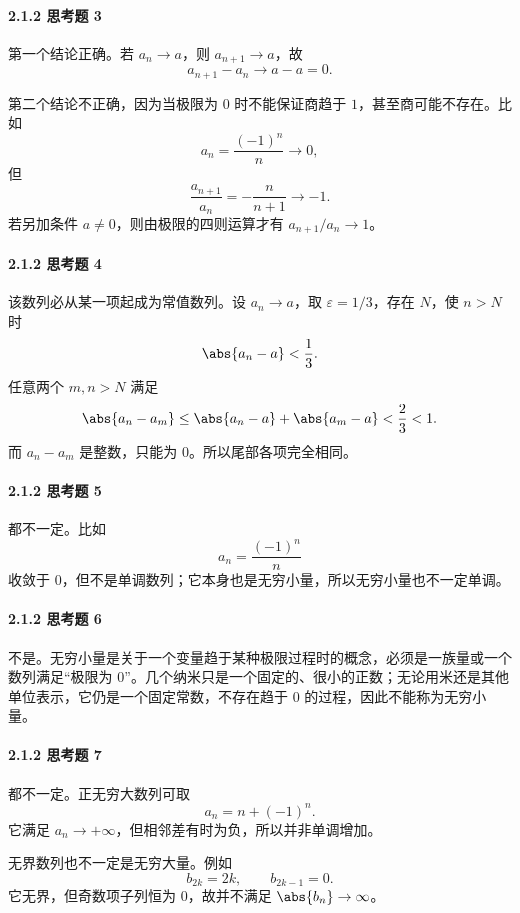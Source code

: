 \paragraph{2.1.2 思考题 3}
\begin{xsolution}
第一个结论正确。若 $a_n\to a$，则 $a_{n+1}\to a$，故
\[
  a_{n+1}-a_n\to a-a=0.
\]

第二个结论不正确，因为当极限为 $0$ 时不能保证商趋于 $1$，甚至商可能不存在。比如
\[
  a_n=\frac{(-1)^n}{n}\to0,
\]
但
\[
  \frac{a_{n+1}}{a_n}=-\frac{n}{n+1}\to-1.
\]
若另加条件 $a\ne0$，则由极限的四则运算才有 $a_{n+1}/a_n\to1$。
\end{xsolution}

\paragraph{2.1.2 思考题 4}
\begin{xsolution}
该数列必从某一项起成为常值数列。设 $a_n\to a$，取 $\varepsilon=1/3$，存在 $N$，使 $n>N$ 时
\[
  \abs{a_n-a}<\frac13.
\]
任意两个 $m,n>N$ 满足
\[
  \abs{a_n-a_m}\le\abs{a_n-a}+\abs{a_m-a}<\frac23<1.
\]
而 $a_n-a_m$ 是整数，只能为 $0$。所以尾部各项完全相同。
\end{xsolution}

\paragraph{2.1.2 思考题 5}
\begin{xsolution}
都不一定。比如
\[
  a_n=\frac{(-1)^n}{n}
\]
收敛于 $0$，但不是单调数列；它本身也是无穷小量，所以无穷小量也不一定单调。
\end{xsolution}

\paragraph{2.1.2 思考题 6}
\begin{xsolution}
不是。无穷小量是关于一个变量趋于某种极限过程时的概念，必须是一族量或一个数列满足“极限为 $0$”。几个纳米只是一个固定的、很小的正数；无论用米还是其他单位表示，它仍是一个固定常数，不存在趋于 $0$ 的过程，因此不能称为无穷小量。
\end{xsolution}

\paragraph{2.1.2 思考题 7}
\begin{xsolution}
都不一定。正无穷大数列可取
\[
  a_n=n+(-1)^n.
\]
它满足 $a_n\to+\infty$，但相邻差有时为负，所以并非单调增加。

无界数列也不一定是无穷大量。例如
\[
  b_{2k}=2k,\qquad b_{2k-1}=0.
\]
它无界，但奇数项子列恒为 $0$，故并不满足 $\abs{b_n}\to\infty$。
\end{xsolution}


